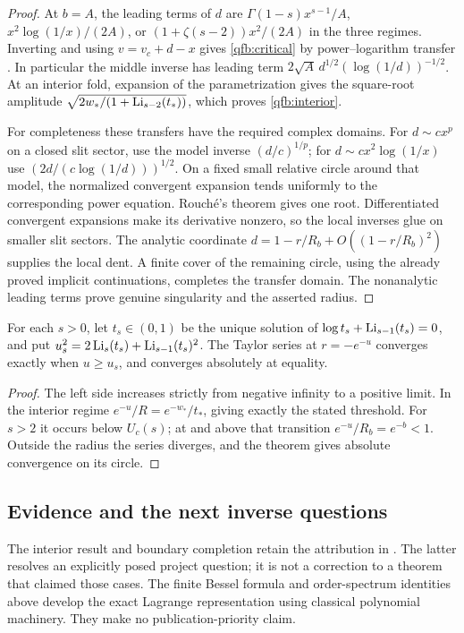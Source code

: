 \begin{proof}
At $b=A$, the leading terms of $d$ are
$\Gamma(1-s)x^{s-1}/A$, $x^2\log(1/x)/(2A)$, or
$(1+\zeta(s-2))x^2/(2A)$ in the three regimes.
Inverting and using $v=v_c+d-x$ gives \eqref{qfb:critical} by
power--logarithm transfer \cite{qfb:transfer}. In particular the middle
inverse has leading term $2\sqrt A\,d^{1/2}(\log(1/d))^{-1/2}$.
At an interior fold, expansion of the parametrization gives the
square-root amplitude $\sqrt{2w_* /(1+\operatorname{Li}_{s-2}(t_*))}$,
which proves \eqref{qfb:interior}.

For completeness these transfers have the required complex domains.
For $d\sim cx^p$ on a closed slit sector, use the model inverse
$(d/c)^{1/p}$; for $d\sim cx^2\log(1/x)$ use
$(2d/(c\log(1/d)))^{1/2}$. On a fixed small relative circle around
that model, the normalized convergent expansion tends uniformly to
the corresponding power equation. Rouch\'e's theorem gives one root.
Differentiated convergent expansions make its derivative nonzero,
so the local inverses glue on smaller slit sectors.
The analytic coordinate $d=1-r/R_b+O((1-r/R_b)^2)$ supplies the
local dent. A finite cover of the remaining circle, using the already
proved implicit continuations, completes the transfer domain.
The nonanalytic leading terms prove genuine singularity and the
asserted radius.
\end{proof}

\begin{corollary}\label{qfb:physical}
For each $s>0$, let $t_s\in(0,1)$ be the unique solution of
$\log t_s+\operatorname{Li}_{s-1}(t_s)=0$, and put
$u_s^2=2\operatorname{Li}_s(t_s)+\operatorname{Li}_{s-1}(t_s)^2$.
The Taylor series at $r=-e^{-u}$ converges exactly when $u\ge u_s$,
and converges absolutely at equality.
\end{corollary}
\begin{proof}
The left side increases strictly from negative infinity to a positive
limit. In the interior regime $e^{-u}/R=e^{-w_*}/t_*$, giving exactly
the stated threshold. For $s>2$ it occurs below $U_c(s)$; at and above
that transition $e^{-u}/R_b=e^{-b}<1$. Outside the radius the series
diverges, and the theorem gives absolute convergence on its circle.
\end{proof}

\subsection{Evidence and the next inverse questions}
The interior result and boundary completion retain the attribution in
\cite{qfb:reports}. The latter resolves an explicitly posed project
question; it is not a correction to a theorem that claimed those cases.
The finite Bessel formula and order-spectrum identities above develop
the exact Lagrange representation using classical polynomial machinery.
They make no publication-priority claim.


